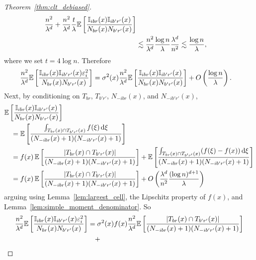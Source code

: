 \begin{proof}[Theorem~\ref{thm:clt_debiased}]
\begin{align*}
    \frac{n^2}{\lambda^d}
    + \frac{n^2}{\lambda^d}
    \frac{t}{\lambda}
    \mathbb{E} \left[
      \frac{\mathbb{I}_{i b r}(x) \mathbb{I}_{i b' r'}(x)}
      {N_{b r}(x) N_{b' r'}(x)}
    \right] \\
    &\lesssim
    \frac{n^2}{\lambda^d}
    \frac{\log n}{\lambda}
    \frac{\lambda^d}{n^2}
    \lesssim
    \frac{\log n}{\lambda},
  \end{align*}
  where we set $t = 4 \log n$.
  Therefore
  \begin{align*}
    \frac{n^2}{\lambda^d}
    \mathbb{E} \left[
      \frac{\mathbb{I}_{i b r}(x) \mathbb{I}_{i b' r'}(x) \varepsilon_i^2}
      {N_{b r}(x) N_{b' r'}(x)}
    \right]
    &=
    \sigma^2(x)
    \frac{n^2}{\lambda^d}
    \mathbb{E} \left[
      \frac{\mathbb{I}_{i b r}(x) \mathbb{I}_{i b' r'}(x)}
      {N_{b r}(x) N_{b' r'}(x)}
    \right]
    + O \left( \frac{\log n}{\lambda} \right).
  \end{align*}
  Next, by conditioning on
  $T_{b r}$, $T_{b' r'}$, $N_{-i b r}(x)$, and $N_{-i b' r'}(x)$,
  \begin{align*}
    &\mathbb{E} \left[
      \frac{\mathbb{I}_{i b r}(x) \mathbb{I}_{i b' r'}(x)}
      {N_{b r}(x) N_{b' r'}(x)}
    \right] \\
    &\quad= \mathbb{E} \left[
      \frac{\int_{T_{b r}(x) \cap T_{b' r'}(x)} f(\xi) \,\mathrm{d}\xi}
      {(N_{-i b r}(x)+1) (N_{-i b' r'}(x)+1)}
    \right] \\
    &\quad= f(x) \,
    \mathbb{E} \left[
      \frac{|T_{b r}(x) \cap T_{b' r'}(x)|}
      {(N_{-i b r}(x)+1) (N_{-i b' r'}(x)+1)}
    \right]
    +
    \mathbb{E} \left[
      \frac{\int_{T_{b r}(x) \cap T_{b' r'}(x)}
      (f(\xi) - f(x)) \,\mathrm{d}\xi}
      {(N_{-i b r}(x)+1) (N_{-i b' r'}(x)+1)}
    \right] \\
    &\quad=
    f(x) \,
    \mathbb{E} \left[
      \frac{|T_{b r}(x) \cap T_{b' r'}(x)|}
      {(N_{-i b r}(x)+1) (N_{-i b' r'}(x)+1)}
    \right]
    + O \left(
      \frac{\lambda^d}{n^2}
      \frac{(\log n)^{d+1}}{\lambda}
    \right)
  \end{align*}
  arguing using Lemma~\ref{lem:largest_cell},
  the Lipschitz property of $f(x)$,
  and Lemma~\ref{lem:simple_moment_denominator}. So
  \begin{align*}
    \frac{n^2}{\lambda^d}
    \E \left[
      \frac{\I_{i b r}(x) \I_{i b' r'}(x) \varepsilon_i^2}
      {N_{b r}(x) N_{b' r'}(x)}
    \right]
    &=
    \sigma^2(x)
    f(x)
    \frac{n^2}{\lambda^d}
    \E \left[
      \frac{|T_{b r}(x) \cap T_{b' r'}(x)|}
      {(N_{-i b r}(x)+1) (N_{-i b' r'}(x)+1)}
    \right] \\
    &\quad+

\end{align*}
\end{proof}
